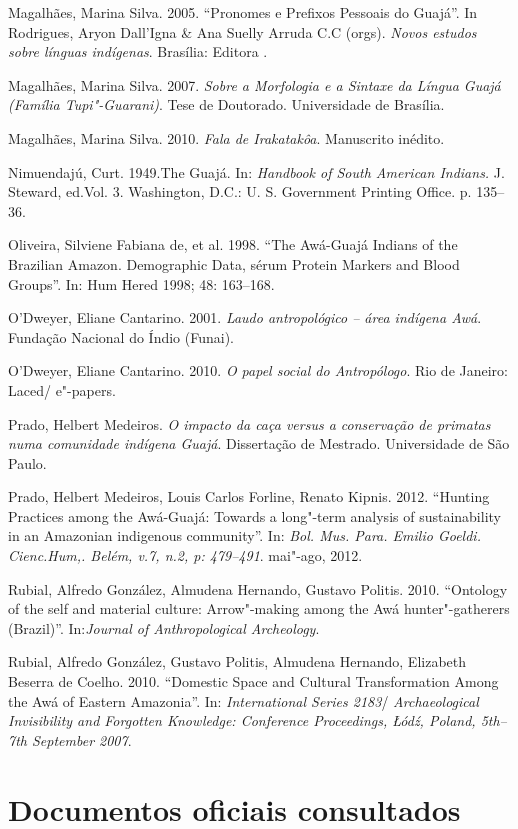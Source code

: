 \begin{Parskip}
Magalhães, Marina Silva. 2005. ``Pronomes e Prefixos Pessoais do
Guajá''. In Rodrigues, Aryon Dall'Igna \& Ana Suelly Arruda C.C (orgs).
\emph{Novos estudos sobre línguas indígenas}. Brasília: Editora .

Magalhães, Marina Silva. 2007. \emph{Sobre a Morfologia e a Sintaxe da
Língua Guajá (Família Tupi"-Guarani)}. Tese de Doutorado. Universidade de
Brasília.

Magalhães, Marina Silva. 2010. \emph{Fala de Irakatakôa}. Manuscrito
inédito.

Nimuendajú, Curt. 1949.The Guajá. In: \emph{Handbook of South American
Indians.} J. Steward, ed.Vol. 3. Washington, D.C.: U. S. Government
Printing Office. p. 135--36.

Oliveira, Silviene Fabiana de, et al. 1998. ``The Awá-Guajá Indians of
the Brazilian Amazon. Demographic Data, sérum Protein Markers and Blood
Groups''. In: Hum Hered 1998; 48: 163--168.

O'Dweyer, Eliane Cantarino. 2001. \emph{Laudo antropológico -- área
indígena Awá}. Fundação Nacional do Índio (Funai).

O'Dweyer, Eliane Cantarino. 2010. \emph{O papel social do Antropólogo}.
Rio de Janeiro: Laced/ e"-papers.

Prado, Helbert Medeiros. \emph{O impacto da caça versus a conservação de
primatas numa comunidade indígena Guajá}. Dissertação de Mestrado.
Universidade de São Paulo.

Prado, Helbert Medeiros, Louis Carlos Forline, Renato Kipnis. 2012.
``Hunting Practices among the Awá-Guajá: Towards a long"-term analysis of
sustainability in an Amazonian indigenous community''. In: \emph{Bol. Mus.
Para. Emilio Goeldi. Cienc.Hum,. Belém, v.7, n.2, p: 479--491}. mai"-ago,
2012.

Rubial, Alfredo González, Almudena Hernando, Gustavo Politis. 2010.
``Ontology of the self and material culture: Arrow"-making among the Awá
hunter"-gatherers (Brazil)''. In:\emph{Journal of Anthropological
Archeology}.

Rubial, Alfredo González, Gustavo Politis, Almudena Hernando, Elizabeth
Beserra de Coelho. 2010. ``Domestic Space and Cultural Transformation
Among the Awá of Eastern Amazonia''. In: \emph{ International Series
2183}/ \emph{Archaeological Invisibility and Forgotten Knowledge:
Conference Proceedings, Łódź, Poland, 5th--7th September 2007}.

\section{Documentos oficiais consultados}


\end{Parskip}
